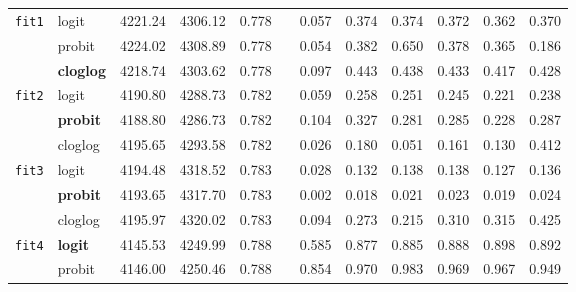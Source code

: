 \begin{tabular}{clcccccccccc}
\texttt{fit1}   & logit              & 4221.24   & 4306.12   & 0.778   &   & 0.057   & 0.374   & 0.374   & 0.372   & 0.362   & 0.370   \\
       & probit             & 4224.02   & 4308.89   & 0.778   &   & 0.054   & 0.382   & 0.650   & 0.378   & 0.365   & 0.186   \\
       & \textbf{cloglog}   & 4218.74   & 4303.62   & 0.778   &   & 0.097   & 0.443   & 0.438   & 0.433   & 0.417   & 0.428   \\
\texttt{fit2}   & logit              & 4190.80   & 4288.73   & 0.782   &   & 0.059   & 0.258   & 0.251   & 0.245   & 0.221   & 0.238   \\
       & \textbf{probit}    & 4188.80   & 4286.73   & 0.782   &   & 0.104   & 0.327   & 0.281   & 0.285   & 0.228   & 0.287   \\
       & cloglog            & 4195.65   & 4293.58   & 0.782   &   & 0.026   & 0.180   & 0.051   & 0.161   & 0.130   & 0.412   \\
\texttt{fit3}   & logit              & 4194.48   & 4318.52   & 0.783   &   & 0.028   & 0.132   & 0.138   & 0.138   & 0.127   & 0.136   \\
       & \textbf{probit}    & 4193.65   & 4317.70   & 0.783   &   & 0.002   & 0.018   & 0.021   & 0.023   & 0.019   & 0.024   \\
       & cloglog            & 4195.97   & 4320.02   & 0.783   &   & 0.094   & 0.273   & 0.215   & 0.310   & 0.315   & 0.425   \\
\texttt{fit4}   & \textbf{logit}     & 4145.53   & 4249.99   & 0.788   &   & 0.585   & 0.877   & 0.885   & 0.888   & 0.898   & 0.892   \\
       & probit             & 4146.00   & 4250.46   & 0.788   &   & 0.854   & 0.970   & 0.983   & 0.969   & 0.967   & 0.949   \\

\end{tabular}

